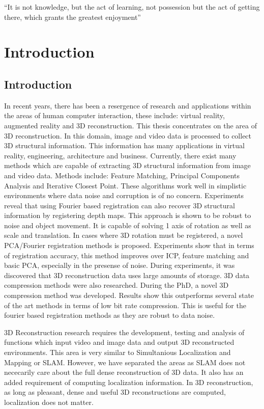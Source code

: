 \begin{savequote}[8cm]
  ``It is not knowledge, but the act of learning, not possession but the act of getting there, which grants the greatest enjoyment''
\end{savequote}
\makeatletter
\chapter{Introduction}

\section{Introduction}



In recent years, there has been a resergence of research and applications within the areas of human computer interaction, these include: virtual reality, augmented reality and 3D reconstruction. This thesis concentrates on the area of 3D reconstruction. In this domain, image and video data is processed to collect 3D structural information. This information has many applications in virtual reality, engineering, architecture and business. Currently, there exist many methods which are capable of extracting 3D structural information from image and video data. Methods include: Feature Matching, Principal Components Analysis and Iterative Closest Point. These algorithms work well in simplistic environments where data noise and corruption is of no concern. Experiments reveal that using Fourier based registration can also recover 3D structural information by registering depth maps. This approach is shown to be robust to noise and object movement. It is capable of solving 1 axis of rotation as well as scale and translation. In cases where 3D rotation must be registered, a novel PCA/Fourier registration methods is proposed. Experiments show that in terms of registration accuracy, this method improves over ICP, feature matching and basic PCA, especially in the presense of noise. During experiments, it was discovered that 3D reconstruction data uses large amounts of storage. 3D data compression methods were also researched. During the PhD, a novel 3D compression method was developed. Results show this outperforms several state of the art methods in terms of low bit rate compression. This is useful for the fourier based registration methods as they are robust to data noise.

3D Reconstruction research requires the development, testing and analysis of functions which input video and image data and output 3D reconstructed environments. This area is very similar to Simultanious Localization and Mapping or SLAM. However, we have separated the areas as SLAM does not nececarily care about the full dense reconstruction of 3D data. It also has an added requirement of computing localization information. In 3D reconstruction, as long as pleasant, dense and useful 3D reconstructions are computed, localization does not matter.


